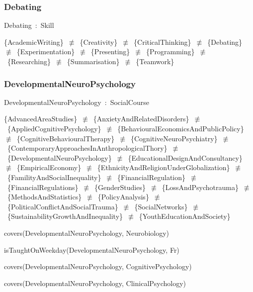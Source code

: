 \documentclass{article}
\begin{document}
\subsubsection*{Debating}

Debating~:~Skill

\{AcademicWriting\}~\ensuremath{\not\equiv}~\{Creativity\}~\ensuremath{\not\equiv}~\{CriticalThinking\}~\ensuremath{\not\equiv}~\{Debating\}~\ensuremath{\not\equiv}~\{Experimentation\}~\ensuremath{\not\equiv}~\{Presenting\}~\ensuremath{\not\equiv}~\{Programming\}~\ensuremath{\not\equiv}~\{Researching\}~\ensuremath{\not\equiv}~\{Summarisation\}~\ensuremath{\not\equiv}~\{Teamwork\}

\subsubsection*{DevelopmentalNeuroPsychology}

DevelopmentalNeuroPsychology~:~SocialCourse

\{AdvancedAreaStudies\}~\ensuremath{\not\equiv}~\{AnxietyAndRelatedDisorders\}~\ensuremath{\not\equiv}~\{AppliedCognitivePsychology\}~\ensuremath{\not\equiv}~\{BehaviouralEconomicsAndPublicPolicy\}~\ensuremath{\not\equiv}~\{CognitiveBehaviouralTherapy\}~\ensuremath{\not\equiv}~\{CognitiveNeuroPsychiatry\}~\ensuremath{\not\equiv}~\{ContemporaryApproachesInAnthropologicalThory\}~\ensuremath{\not\equiv}~\{DevelopmentalNeuroPsychology\}~\ensuremath{\not\equiv}~\{EducationalDesignAndConsultancy\}~\ensuremath{\not\equiv}~\{EmpiricalEconomy\}~\ensuremath{\not\equiv}~\{EthnicityAndReligionUnderGlobalization\}~\ensuremath{\not\equiv}~\{FamilityAndSocialInequality\}~\ensuremath{\not\equiv}~\{FinancialRegulation\}~\ensuremath{\not\equiv}~\{FinancialRegulations\}~\ensuremath{\not\equiv}~\{GenderStudies\}~\ensuremath{\not\equiv}~\{LossAndPsychotrauma\}~\ensuremath{\not\equiv}~\{MethodsAndStatistics\}~\ensuremath{\not\equiv}~\{PolicyAnalysis\}~\ensuremath{\not\equiv}~\{PoliticalConflictAndSocialTrauma\}~\ensuremath{\not\equiv}~\{SocialNetworks\}~\ensuremath{\not\equiv}~\{SustainabilityGrowthAndInequality\}~\ensuremath{\not\equiv}~\{YouthEducationAndSociety\}

covers(DevelopmentalNeuroPsychology, Neurobiology)

isTaughtOnWeekday(DevelopmentalNeuroPsychology, Fr)

covers(DevelopmentalNeuroPsychology, CognitivePsychology)

covers(DevelopmentalNeuroPsychology, ClinicalPsychology)
\end{document}
